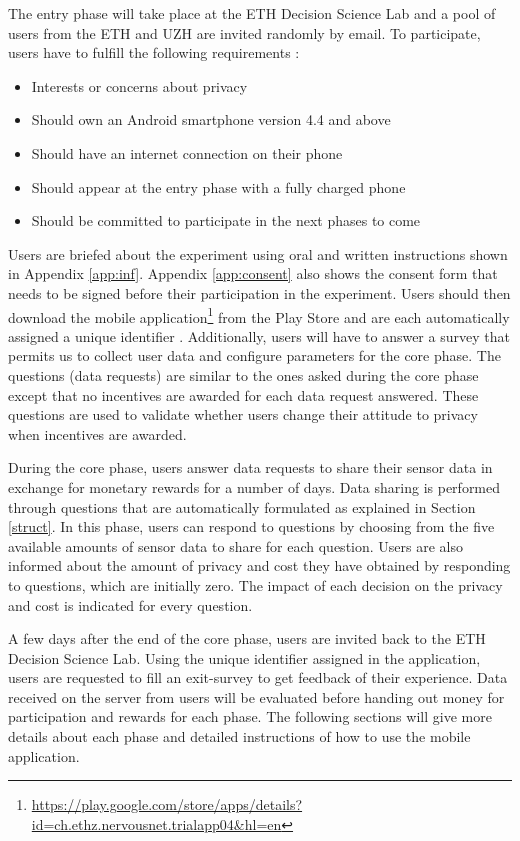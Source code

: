 The entry phase will take place at the ETH Decision Science Lab and a pool of users from the ETH and UZH are invited randomly by email. To participate, users have to fulfill the following requirements \cite{pournarasethical}:

\begin{itemize}
\item Interests or concerns about privacy
\item Should own an Android smartphone version 4.4 and above
\item Should have an internet connection on their phone
\item Should appear at the entry phase with a fully charged phone
\item Should be committed to participate in the next phases to come
\end{itemize}

Users are briefed about the experiment using oral and written instructions shown in Appendix \ref{app:inf}. Appendix \ref{app:consent} also shows the consent form that needs to be signed before their participation in the experiment. Users should then download the mobile application\footnote{\url{https://play.google.com/store/apps/details?id=ch.ethz.nervousnet.trialapp04&hl=en}} from the Play Store and are each automatically assigned a unique identifier . Additionally, users will have to answer a survey that permits us to collect user data and configure parameters for the core phase. The questions (data requests) are similar to the ones asked during the core phase except that no incentives are awarded for each data request answered. These questions are used to validate whether users change their attitude to privacy when incentives are awarded.

During the core phase, users answer data requests to share their sensor data in exchange for monetary rewards for a number of days. Data sharing is performed through questions that are automatically formulated as explained in Section \ref{struct}. In this phase, users can respond to questions by choosing from the five available amounts of sensor data to share for each question. Users are also informed about the amount of privacy and cost they have obtained by responding to questions, which are initially zero. The impact of each decision on the privacy and cost is indicated for every question.

A few days after the end of the core phase, users are invited back to the ETH Decision Science Lab. Using the unique identifier assigned in the application, users are requested to fill an exit-survey to get feedback of their experience. Data received on the server from users will be evaluated before handing out money for participation and rewards for each phase. The following sections will give more details about each phase and detailed instructions of how to use the mobile application.

